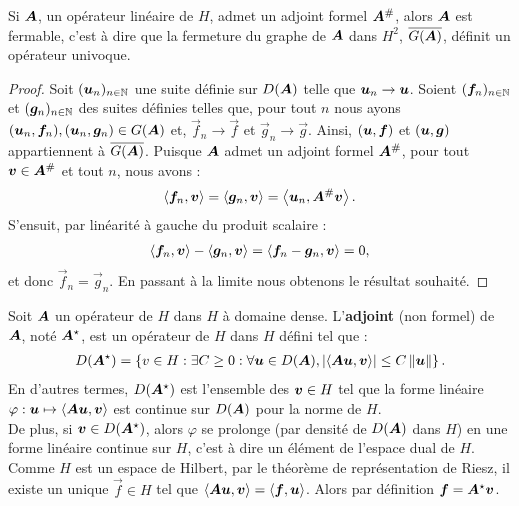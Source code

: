 \begin{proposition}
	Si $\bm{A}$, un opérateur linéaire de $H$, admet un adjoint formel $\bm{A}^{\#}$,
	alors $\bm{A}$ est fermable, c'est à dire que la fermeture du graphe de $\bm{A}$
	dans $H^2$, $\overline{G(\bm{A})}$, définit un opérateur univoque.
\end{proposition}

\begin{proof}
	Soit $(\bm{u}_n)_{n \in \mathbb{N}}$ une suite définie sur $D(\bm{A})$
	telle que $\bm{u}_n \rightarrow \bm{u}$.
	Soient $(\bm{f}_n)_{n \in \mathbb{N}}$ et $(\bm{g}_n)_{n \in \mathbb{N}}$
	des suites définies telles que, pour tout $n$ nous ayons
	$(\bm{u}_n,\bm{f}_n) , (\bm{u}_n,\bm{g}_n) \in G(\bm{A})$ et,
	$\Vec{f}_n \rightarrow \Vec{f}$ et $\Vec{g}_n \rightarrow \Vec{g}$.
	Ainsi, $(\bm{u},\bm{f})$  et $(\bm{u},\bm{g})$ appartiennent à $\overline{G(\bm{A})}$.
	Puisque $\bm{A}$ admet un adjoint formel $\bm{A}^{\#}$, pour tout
	$\bm{v} \in \bm{A}^{\#}$ et tout $n$, nous avons :
	\begin{align}
		\left\langle \bm{f}_n , \bm{v} \right\rangle =
		\left\langle \bm{g}_n , \bm{v} \right\rangle =
		\left\langle \bm{u}_n , \bm{A}^{\#} \bm{v} \right\rangle .
	\end{align}
	S'ensuit, par linéarité à gauche du produit scalaire :
	\begin{align}
		\left\langle \bm{f}_n , \bm{v} \right\rangle -
		\left\langle \bm{g}_n , \bm{v} \right\rangle =
		\left\langle \bm{f}_n - \bm{g}_n , \bm{v} \right\rangle = 0 ,
	\end{align}
	et donc $\Vec{f}_n = \Vec{g}_n$.
	En passant à la limite nous obtenons le résultat souhaité.
\end{proof}

\begin{definition}
	Soit $\bm{A}$ un opérateur de $H$ dans $H$ à domaine dense.
	L'\textbf{adjoint} (non formel) de $\bm{A}$, noté $\bm{A}^\star$,
	est un opérateur de $H$ dans $H$
	défini tel que :
	\begin{align}
		D(\bm{A}^\star) = \left\{
			v \in H : \exists C \ge 0 : \forall \bm{u} \in D(\bm{A}),
			\left\vert\left\langle \bm{A} \bm{u} , \bm{v} \right\rangle\right\vert
			\le C \left\Vert\bm{u}\right\Vert
		\right\} .
	\end{align}
	En d'autres termes, $D(\bm{A}^\star)$ est l'ensemble des $\bm{v} \in H$
	tel que la forme linéaire
	$\varphi : \bm{u} \mapsto \left\langle \bm{A} \bm{u}, \bm{v} \right\rangle$
	est continue sur $D(\bm{A})$ pour la norme de $H$.
	\\
	De plus, si $\bm{v} \in D(\bm{A}^\star)$, alors $\varphi$
	se prolonge (par densité de $D(\bm{A})$ dans $H$) en une forme linéaire
	continue sur $H$, c'est à dire un élément de l'espace dual de $H$.
	Comme $H$ est un espace de Hilbert, par le théorème de représentation
	de Riesz, il existe un unique $\Vec{f} \in H$ tel que
	$\left\langle \bm{A} \bm{u} , \bm{v} \right\rangle =
	\left\langle \bm{f} , \bm{u} \right\rangle$.
	Alors par définition $\bm{f} = \bm{A}^\star \bm{v}$.
\end{definition}

